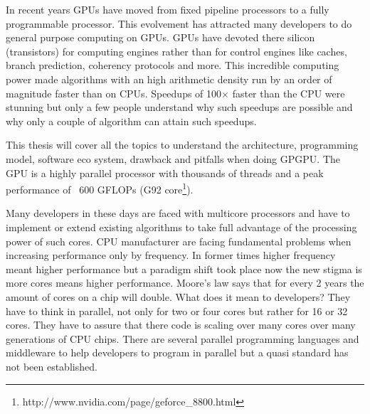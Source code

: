 


In recent years \glspl{GPU} have moved from fixed pipeline  processors to a 
fully programmable processor. This evolvement
has attracted many developers to do general purpose computing on \glspl{GPU}.
\glspl{GPU} have devoted there silicon (transistors) for computing engines
rather than for control engines like caches, branch prediction, coherency
protocols and more. This incredible computing power made algorithms with an high
arithmetic density run by an order of magnitude faster than on \glspl{CPU}.
Speedups of 100$\times$ faster than the \gls{CPU} were stunning but
only a few people understand why such speedups are possible and why only a
couple of algorithm can attain such speedups.

This thesis will cover all the topics to understand the architecture,
programming model, software eco system, drawback and pitfalls when doing
\gls{GPGPU}. The \gls{GPU} is a highly parallel processor with
thousands of threads and a peak performance of ~600 \glspl{GFLOP} (G92
core\footnote{http://www.nvidia.com/page/geforce\_8800.html}).

Many developers in these days are faced with multicore processors and have to
implement or extend existing algorithms to take full advantage of the processing
power of such cores. \gls{CPU} manufacturer are facing fundamental problems when
increasing performance only by frequency. In former times higher frequency meant
higher performance but a paradigm shift took place now the new stigma is more
cores means higher performance. Moore's law says that for every 2 years the
amount of cores on a chip will double. What does it mean to developers? They
have to think in parallel, not only for two or four cores but rather for 16 or
32 cores. They have to assure that there code is scaling over many cores over
many generations of \gls{CPU} chips. There are several parallel programming languages
and middleware to help developers to program in parallel but a quasi standard
has not been established.

